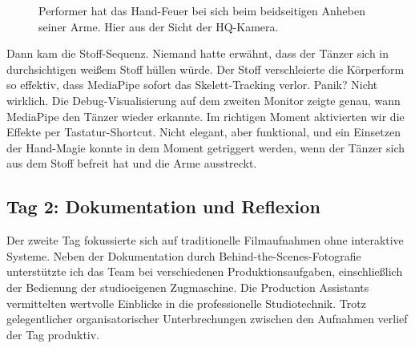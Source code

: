 \begin{figure}[htbp]
    \centering
    \caption{Performer hat das Hand-Feuer bei sich beim beidseitigen Anheben seiner Arme. Hier aus der Sicht der HQ-Kamera.}
    \label{fig:hand_fire_setup}
\end{figure}

Dann kam die Stoff-Sequenz. Niemand hatte erwähnt, dass der Tänzer sich in durchsichtigen weißem Stoff hüllen würde. Der Stoff verschleierte die Körperform so effektiv, dass MediaPipe sofort das Skelett-Tracking verlor. Panik? Nicht wirklich. Die Debug-Visualisierung auf dem zweiten Monitor zeigte genau, wann MediaPipe den Tänzer wieder erkannte. Im richtigen Moment aktivierten wir die Effekte per Tastatur-Shortcut. Nicht elegant, aber funktional, und ein Einsetzen der Hand-Magie konnte in dem Moment getriggert werden, wenn der Tänzer sich aus dem Stoff befreit hat und die Arme ausstreckt.



\subsection{Tag 2: Dokumentation und Reflexion}

Der zweite Tag fokussierte sich auf traditionelle Filmaufnahmen ohne interaktive Systeme. Neben der Dokumentation durch Behind-the-Scenes-Fotografie unterstützte ich das Team bei verschiedenen Produktionsaufgaben, einschließlich der Bedienung der studioeigenen Zugmaschine. Die Production Assistants vermittelten wertvolle Einblicke in die professionelle Studiotechnik. Trotz gelegentlicher organisatorischer Unterbrechungen zwischen den Aufnahmen verlief der Tag produktiv.



